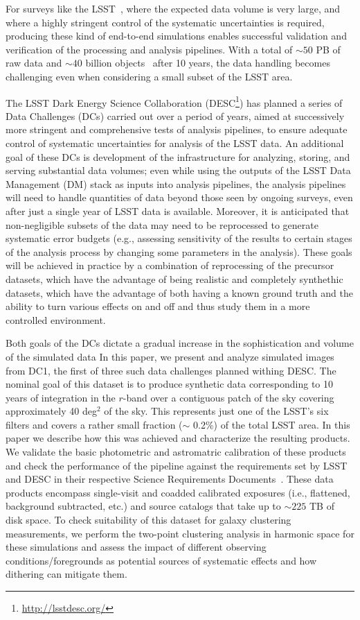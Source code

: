 \documentclass[twocolumn]{aastex62}
\begin{document}
For surveys like the LSST~\citep{Overview}, where the expected data volume is very large, and where a highly stringent control of the systematic uncertainties is required, producing these
kind of end-to-end simulations enables successful validation and verification of the processing and
analysis pipelines. With a total of $\sim 50$ PB of raw data and $\sim 40$ billion objects~\citep{Overview} after 10 years, the
data handling becomes challenging even when considering a small subset of the LSST area.  

The LSST Dark Energy Science Collaboration
(DESC\footnote{\url{http://lsstdesc.org/}}) has planned a series of
Data Challenges (DCs) carried out over a period of years, aimed at
successively more stringent and comprehensive tests of analysis
pipelines, to ensure adequate control of systematic uncertainties for
analysis of the LSST data.  An additional goal of these DCs is
development of the infrastructure for analyzing, storing, and serving
substantial data volumes; even while using the outputs of the LSST
Data Management (DM) stack as inputs into analysis pipelines, the
analysis pipelines will need to handle quantities of data beyond those
seen by ongoing surveys, even after just a single year of LSST data is
available. Moreover, it is anticipated that non-negligible subsets of
the data may need to be reprocessed to generate systematic error
budgets (e.g., assessing sensitivity of the results to certain stages
of the analysis process by changing some parameters in the
analysis). These goals will be achieved in practice by a combination
of reprocessing of the precursor datasets, which have the advantage of
being realistic and completely synthethic datasets, which have the
advantage of both having a known ground truth and the ability to turn
various effects on and off and thus study them in a more controlled
environment.

Both goals of the DCs dictate a gradual increase in the
sophistication and volume of the simulated data In this paper, we
present and analyze simulated images from DC1, the first of three such
data challenges planned withing DESC. The nominal goal of this dataset
is to produce synthetic data corresponding to 10 years of integration
in the $r$-band over a contiguous patch of the sky covering approximately 40 deg$^{2}$ of the
sky. This represents just one of the LSST's six filters and covers a rather 
small fraction ($\sim$ 0.2\%) of the total LSST area. In this paper we
describe how this was achieved and  characterize the resulting
products. We validate the basic photometric and astromatric
calibration of these products and check the performance of the
pipeline against the requirements set by LSST and DESC in their
respective Science Requirements Documents~\citep{LPM-17,
  2018arXiv180901669T}. These data products encompass single-visit and
coadded calibrated exposures (i.e., flattened, background subtracted,
etc.) and source catalogs that take up to $\sim 225$ TB of disk
space. To check suitability of this dataset for galaxy clustering
measurements, we perform the two-point clustering analysis in harmonic space for these simulations and assess the impact of different observing conditions/foregrounds as potential sources of systematic effects and how dithering can mitigate them. 
\end{document}
